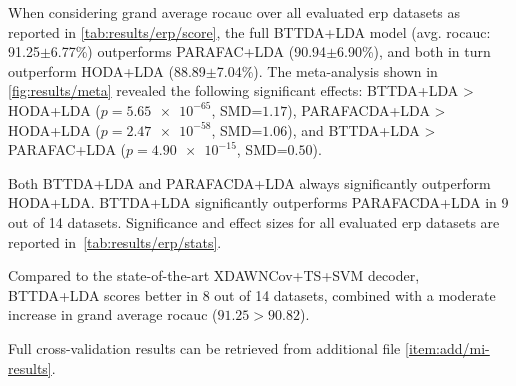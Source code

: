 \documentclass[twocolumn]{article}
\begin{document}
When considering grand average \ac{rocauc} over all evaluated \ac{erp} datasets
as reported in \cref{tab:results/erp/score},
the full BTTDA+LDA model (avg. \ac{rocauc}: 91.25$\pm$6.77\%) outperforms PARAFAC+LDA
(90.94$\pm$6.90\%),
and both in turn outperform HODA+LDA (88.89$\pm$7.04\%).
The meta-analysis shown in \cref{fig:results/meta} revealed the following
significant effects:
BTTDA+LDA > HODA+LDA ($p=\num{5.65e-65}$, SMD=$1.17$),
PARAFACDA+LDA > HODA+LDA ($p=\num{2.47e-58}$, SMD=$1.06$), and
BTTDA+LDA > PARAFAC+LDA ($p=\num{4.90e-15}$, SMD=$0.50$).
Both BTTDA+LDA and PARAFACDA+LDA always significantly outperform HODA+LDA.
BTTDA+LDA significantly outperforms PARAFACDA+LDA in 9 out of 14 datasets.
Significance and effect sizes for all evaluated \ac{erp} datasets are reported in~\cref{tab:results/erp/stats}.

\begin{sidewaystable*}
	\footnotesize
	
	\caption{Area under the receiver operating characteristic curve for
		cross-validated within-session evaluation of HODA+LDA and our proposed decoders
		PARAFACDA+DLA and BTTDA+LDA evaluated on \ac{erp} datasets.
		Scores for other decoders were taken from \textcite{Chevallier2024}.
		BTTDA+LDA always outperforms HODA+LDA and PARAFACDA+LDA, except for datasets,
		and consistently is nearly on par with or outperforms
		the state-of-the-art XDAwnCov+TS+SVM decoder.
	}
	\label{tab:results/erp/score}
\end{sidewaystable*}
Compared to the state-of-the-art XDAWNCov+TS+SVM decoder, BTTDA+LDA scores
better in 8 out of 14 datasets, combined with a moderate increase in grand average \ac{rocauc}
($91.25 > 90.82$).

Full cross-validation results can be retrieved from additional file \cref{item:add/mi-results}.
\end{document}
